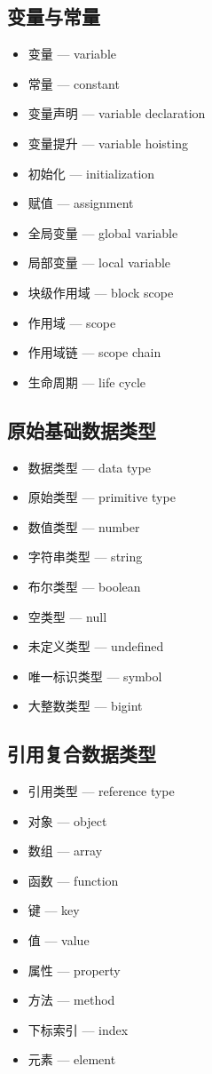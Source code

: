 \subsection{变量与常量}
\begin{itemize}
\item 变量 — variable
\item 常量 — constant
\item 变量声明 — variable declaration
\item 变量提升 — variable hoisting
\item 初始化 — initialization
\item 赋值 — assignment
\item 全局变量 — global variable
\item 局部变量 — local variable
\item 块级作用域 — block scope
\item 作用域 — scope
\item 作用域链 — scope chain
\item 生命周期 — life cycle
\end{itemize}

\subsection{原始基础数据类型}
\begin{itemize}
\item 数据类型 — data type
\item 原始类型 — primitive type
\item 数值类型 — number
\item 字符串类型 — string
\item 布尔类型 — boolean
\item 空类型 — null
\item 未定义类型 — undefined
\item 唯一标识类型 — symbol
\item 大整数类型 — bigint
\end{itemize}

\subsection{引用复合数据类型}
\begin{itemize}
\item 引用类型 — reference type
\item 对象 — object
\item 数组 — array
\item 函数 — function
\item 键 — key
\item 值 — value
\item 属性 — property
\item 方法 — method
\item 下标索引 — index
\item 元素 — element
\end{itemize}

